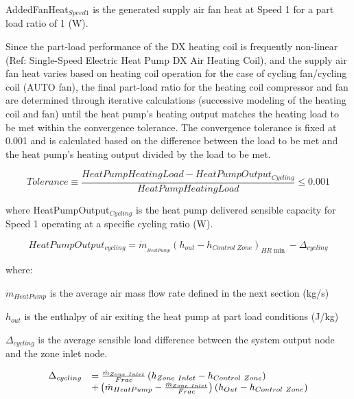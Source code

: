 AddedFanHeat\(_{Speed1}\) is the generated supply air fan heat at Speed 1 for a part load ratio of 1 (W).

Since the part-load performance of the DX heating coil is frequently non-linear (Ref: Single-Speed Electric Heat Pump DX Air Heating Coil), and the supply air fan heat varies based on heating coil operation for the case of cycling fan/cycling coil (AUTO fan), the final part-load ratio for the heating coil compressor and fan are determined through iterative calculations (successive modeling of the heating coil and fan) until the heat pump's heating output matches the heating load to be met within the convergence tolerance. The convergence tolerance is fixed at 0.001 and is calculated based on the difference between the load to be met and the heat pump's heating output divided by the load to be met.

\begin{equation}
  Tolerance \equiv \frac{HeatPumpHeatingLoad - HeatPumpOutput_{Cycling}}{HeatPumpHeatingLoad} \leq 0.001
\end{equation}

where HeatPumpOutput\(_{Cycling}\) is the heat pump delivered sensible capacity for Speed 1 operating at a specific cycling ratio (W).

\begin{equation}
HeatPumpOutpu{t_{cycling}} = {\dot m_{_{HeatPump}}}{\left( {{h_{out}} - {h_{Control\;Zone}}} \right)_{HR\min }} - {\Delta_{cycling}}
\end{equation}

where:

\({\dot m_{HeatPump}}\) is the average air mass flow rate defined in the next section (kg/s)

\(h_{out}\) is the enthalpy of air exiting the heat pump at part load conditions (J/kg)

\(\Delta_{cycling}\) is the average sensible load difference between the system output node and the zone inlet node.

\begin{equation}
  \begin{array}{rl}
    \Delta_{cycling} &= \frac{\dot{m}_{Zone~Inlet}}{Frac} \left(h_{Zone~Inlet} - h_{Control~Zone}\right) \\
                           &+ \left(\dot{m}_{HeatPump} - \frac{\dot{m}_{Zone~Inlet}}{Frac}\right) \left(h_{Out} - h_{Control~Zone}\right)
  \end{array}
\end{equation}

